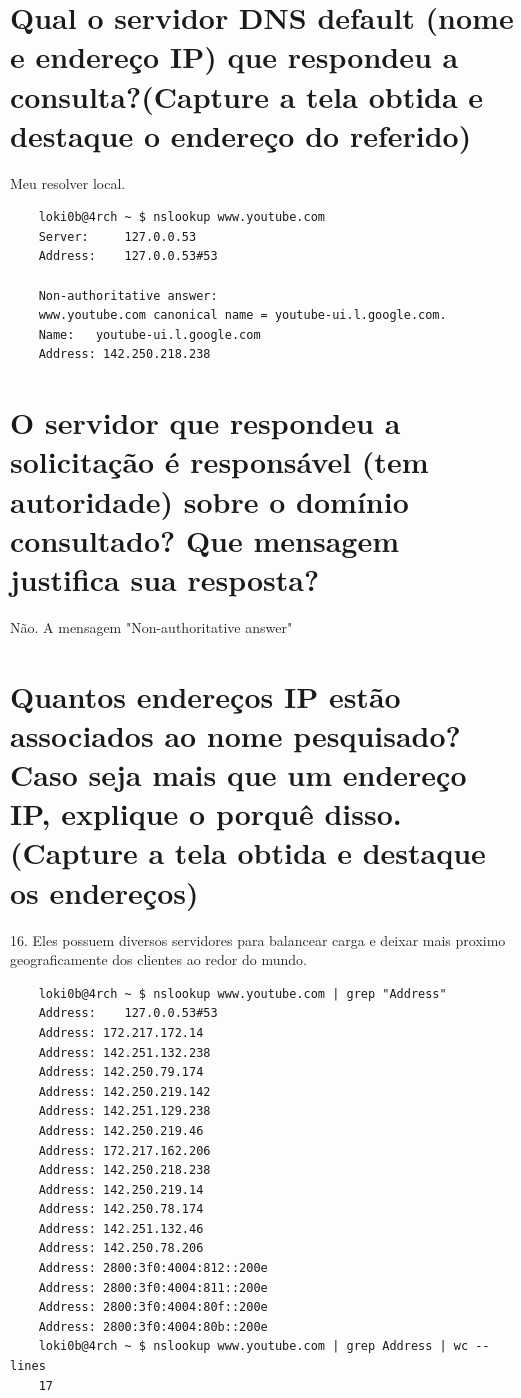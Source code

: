 
\begin{parts}
    \part{Qual o servidor DNS default (nome e endereço IP) que respondeu a consulta?(Capture a tela obtida e destaque o endereço do referido)}
    \begin{solution}
    Meu resolver local.
    \begin{verbatim}
    loki0b@4rch ~ $ nslookup www.youtube.com
    Server:		127.0.0.53
    Address:	127.0.0.53#53

    Non-authoritative answer:
    www.youtube.com	canonical name = youtube-ui.l.google.com.
    Name:	youtube-ui.l.google.com
    Address: 142.250.218.238    
    \end{verbatim}
    \end{solution}

    \part{O servidor que respondeu a solicitação é responsável (tem autoridade) sobre o domínio consultado? Que mensagem justifica sua resposta?}
    \begin{solution}
    Não. A mensagem "Non-authoritative answer"            
    \end{solution}

    \part{Quantos endereços IP estão associados ao nome pesquisado? Caso seja mais que um endereço IP, explique o porquê disso. (Capture a tela obtida e destaque os endereços)}
    \begin{solution}
    16. Eles possuem diversos servidores para balancear carga e deixar mais proximo geograficamente dos clientes ao redor do mundo.
    \begin{verbatim}
    loki0b@4rch ~ $ nslookup www.youtube.com | grep "Address"
    Address:	127.0.0.53#53
    Address: 172.217.172.14
    Address: 142.251.132.238
    Address: 142.250.79.174
    Address: 142.250.219.142
    Address: 142.251.129.238
    Address: 142.250.219.46
    Address: 172.217.162.206
    Address: 142.250.218.238
    Address: 142.250.219.14
    Address: 142.250.78.174
    Address: 142.251.132.46
    Address: 142.250.78.206
    Address: 2800:3f0:4004:812::200e
    Address: 2800:3f0:4004:811::200e
    Address: 2800:3f0:4004:80f::200e
    Address: 2800:3f0:4004:80b::200e
    loki0b@4rch ~ $ nslookup www.youtube.com | grep Address | wc --lines
    17
    \end{verbatim}            
    \end{solution}


\end{parts}
